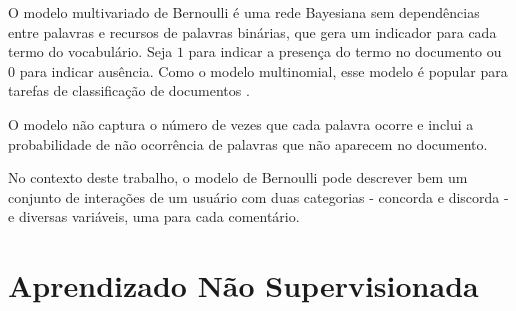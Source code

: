 O modelo multivariado de Bernoulli é uma rede Bayesiana sem dependências entre palavras e recursos de palavras binárias,
que gera um indicador para cada termo do vocabulário. Seja $1$ para indicar a presença do termo no documento ou $ 0 $ para indicar ausência.
Como o modelo multinomial, esse modelo é popular para tarefas de classificação de documentos \cite{nigam1998}.

O modelo não captura o número de vezes que cada palavra ocorre e inclui a probabilidade de não ocorrência de palavras que não aparecem no documento.

No contexto deste trabalho, o modelo de Bernoulli pode descrever bem um conjunto de interações de um usuário com duas categorias - concorda e discorda - e diversas variáveis, uma para cada comentário.











\section{Aprendizado Não Supervisionada}

